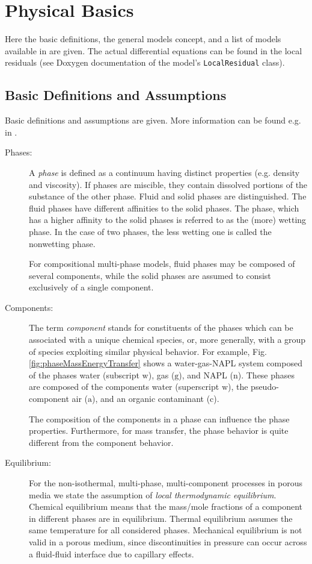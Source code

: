 \section{Physical Basics}
Here the basic definitions, the general models concept, and a list of
models available in \Dumux are given. The actual differential equations
can be found in the local residuals (see Doxygen documentation of the
model's \texttt{LocalResidual} class).

\subsection{Basic Definitions and Assumptions}
Basic definitions and assumptions are given. More information can be found e.g. in \cite{A3:acosta:2006,A3:bielinski:2006}.

\begin{description}
\item[Phases:]
A \emph{phase} is defined as a continuum having distinct properties (e.g. density and viscosity). If phases are miscible, they contain dissolved portions of the substance of the other phase. 
Fluid and solid phases are distinguished. The fluid phases have different affinities to the solid phases. The phase, which has a higher affinity to the solid phases is referred to as the (more) wetting phase. In the case of two phases, the less wetting one is called the nonwetting phase. 

For compositional multi-phase models, fluid phases may be composed of several components, while the solid phases are assumed to consist exclusively of a single component. 

\item[Components:]
The term \emph{component} stands for constituents of the phases which
can be associated with a unique chemical species, or, more generally, with
a group of species exploiting similar physical behavior. For example, Fig. \ref{fig:phaseMassEnergyTransfer} shows a water-gas-NAPL system composed of the phases water (subscript
$\text{w}$), gas ($\text{g}$), and NAPL ($\text{n}$). These phases are
composed of the components water (superscript $\text{w}$), the pseudo-component
air ($\text{a}$), and an organic contaminant ($\text{c}$).

The composition of the components in a phase can influence the phase properties. Furthermore, for mass transfer, the phase behavior is quite different from the component behavior.

\item[Equilibrium:]
For the non-isothermal, multi-phase, multi-component processes in porous media
we state the assumption of \emph{local thermodynamic equilibrium}.
Chemical equilibrium means that the mass/mole fractions of a component in
different phases are in equilibrium.
Thermal equilibrium assumes the same temperature for all considered phases.
Mechanical equilibrium is not valid in a porous medium, since discontinuities
in pressure can occur across a fluid-fluid interface due to capillary effects.


\end{description}
